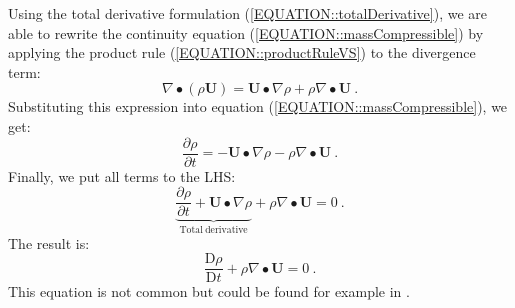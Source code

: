 \documentclass[MathematicsNumericsDerivationsAndOpenFOAM.tex]{subfiles}
\begin{document}
	Using the total derivative formulation (\ref{EQUATION::totalDerivative}),
    we are able to rewrite the continuity equation
    (\ref{EQUATION::massCompressible}) by applying the product rule
    (\ref{EQUATION::productRuleVS}) to the divergence term:
%
%
\begin{equation}
  \nabla \bullet \left(\rho \textbf{U}\right)
=
  \textbf{U} \bullet \nabla \rho + \rho \nabla \bullet \textbf{U} ~.
\end{equation}
%
%
	Substituting this expression into equation
    (\ref{EQUATION::massCompressible}), we get:
%
%
\begin{equation}
 \frac{\partial \rho}{\partial t}
 =
 -\textbf{U} \bullet \nabla \rho - \rho \nabla \bullet \textbf{U} ~.
\end{equation}
%
%
	Finally, we put all terms to the LHS:
%
%
\begin{equation}
 \underbrace{\frac{\partial \rho}{\partial t}
+
 \textbf{U} \bullet \nabla \rho}_{\mathrm{Total~derivative}}
+
 \rho \nabla \bullet \textbf{U}
 =
0 ~.
\end{equation}
%
%
	The result is:
%
%
\begin{equation}
 \frac{\mathrm{D} \rho}{\mathrm{D} t}
+
 \rho \nabla \bullet \textbf{U}
 =
0 ~.
\end{equation}
%
%
	This equation is not common but could be found for example in
    \cite{Anderson}.


\end{document}
